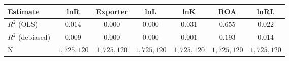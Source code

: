 \begin{tabular}{l*{6}{c}}
\hline\hline
 Estimate & lnR & Exporter & lnL & lnK & ROA & lnRL \\
\hline
\addlinespace $ R^2$ (OLS) & $0.014$ & $0.000$ & $0.000$ & $0.031$ & $0.655$ & $0.022$ \\
$ R^2$ (debiased) & $0.009$ & $0.000$ & $0.000$ & $0.001$ & $0.193$ & $0.014$ \\
N & $1,725,120$ & $1,725,120$ & $1,725,120$ & $1,725,120$ & $1,725,120$ & $1,725,120$ \\
\hline\hline
\end{tabular}
